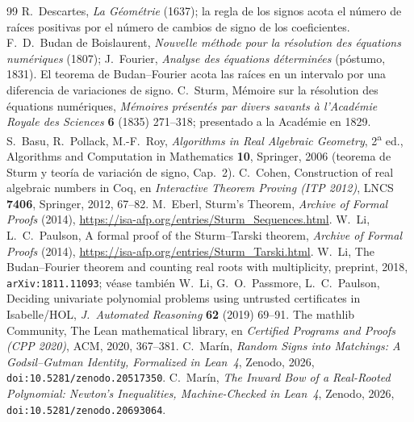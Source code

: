 \documentclass[11pt]{article}
\begin{document}
\begin{thebibliography}{99}\small
{} R.~Descartes, \emph{La G\'eom\'etrie} (1637); la regla de los signos acota el
n\'umero de ra\'ices positivas por el n\'umero de cambios de signo de los coeficientes.
 F.~D.~Budan de Boislaurent, \emph{Nouvelle m\'ethode pour la r\'esolution des
\'equations num\'eriques} (1807); J.~Fourier, \emph{Analyse des \'equations d\'etermin\'ees}
(p\'ostumo, 1831). El teorema de Budan--Fourier acota las ra\'ices en un intervalo por una diferencia
de variaciones de signo.
 C.~Sturm, M\'emoire sur la r\'esolution des \'equations num\'eriques,
\emph{M\'emoires pr\'esent\'es par divers savants \`a l'Acad\'emie Royale des Sciences} \textbf{6}
(1835) 271--318; presentado a la Acad\'emie en 1829.
 S.~Basu, R.~Pollack, M.-F.~Roy, \emph{Algorithms in Real Algebraic Geometry}, 2\textsuperscript{a}
ed., Algorithms and Computation in Mathematics \textbf{10}, Springer, 2006 (teorema de Sturm y teor\'ia
de variaci\'on de signo, Cap.~2).
 C.~Cohen, Construction of real algebraic numbers in Coq, en \emph{Interactive
Theorem Proving (ITP 2012)}, LNCS \textbf{7406}, Springer, 2012, 67--82.
 M.~Eberl, Sturm's Theorem, \emph{Archive of Formal Proofs} (2014),
\url{https://isa-afp.org/entries/Sturm_Sequences.html}.
 W.~Li, L.~C.~Paulson, A formal proof of the Sturm--Tarski theorem,
\emph{Archive of Formal Proofs} (2014), \url{https://isa-afp.org/entries/Sturm_Tarski.html}.
 W.~Li, The Budan--Fourier theorem and counting real roots with multiplicity,
preprint, 2018, \texttt{arXiv:1811.11093}; v\'ease tambi\'en W.~Li, G.~O.~Passmore, L.~C.~Paulson,
Deciding univariate polynomial problems using untrusted certificates in Isabelle/HOL, \emph{J.~Automated
Reasoning} \textbf{62} (2019) 69--91.
 The mathlib Community, The Lean mathematical library, en \emph{Certified Programs
and Proofs (CPP 2020)}, ACM, 2020, 367--381.
 C.~Mar\'in, \emph{Random Signs into Matchings: A Godsil--Gutman Identity,
Formalized in Lean~4}, Zenodo, 2026, \texttt{doi:10.5281/zenodo.20517350}.
 C.~Mar\'in, \emph{The Inward Bow of a Real-Rooted Polynomial: Newton's
Inequalities, Machine-Checked in Lean~4}, Zenodo, 2026, \texttt{doi:10.5281/zenodo.20693064}.
\end{thebibliography}
\end{document}
